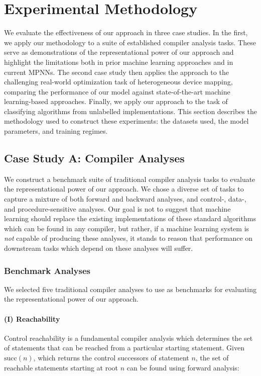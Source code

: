 \section{Experimental Methodology}%
\label{sec:methodology}

We evaluate the effectiveness of our approach in three case
studies. In the first, we apply our methodology to a suite of
established compiler analysis tasks. These serve as demonstrations of
the representational power of our approach and highlight the
limitations both in prior machine learning approaches and in current
MPNNs. The second case study then applies the approach to the
challenging real-world optimization task of heterogeneous device
mapping, comparing the performance of our model against
state-of-the-art machine learning-based approaches. Finally, we apply
our approach to the task of classifying algorithms from unlabelled
implementations. This section describes the methodology used to
construct these experiments: the datasets used, the model parameters,
and training regimes.


\subsection{Case Study A: Compiler Analyses}

We construct a benchmark suite of traditional compiler analysis tasks
to evaluate the representational power of our approach.  We chose a
diverse set of tasks to capture a mixture of both forward and backward
analyses, and control-, data-, and procedure-sensitive analyses. Our
goal is not to suggest that machine learning should replace the
existing implementations of these standard algorithms which can be
found in any compiler, but rather, if a machine learning system is
\emph{not} capable of producing these analyses, it stands to reason
that performance on downstream tasks which depend on these analyses
will suffer.

\subsubsection{Benchmark Analyses}

We selected five traditional compiler analyses to use as benchmarks
for evaluating the representational power of our approach.

\paragraph{(I) Reachability} Control reachability is a fundamental
compiler analysis which determines the set of statements that can be
reached from a particular starting statement. Given $\text{succ}(n)$,
which returns the control successors of statement $n$, the set of
reachable statements starting at root $n$ can be found using forward
analysis:

